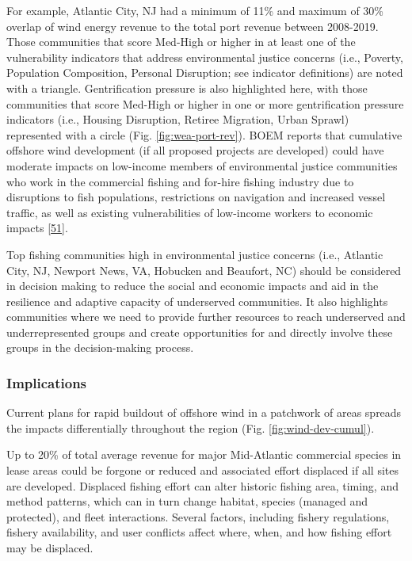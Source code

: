 \documentclass[
  10pt,
]{article}
\begin{document}
For example, Atlantic City, NJ had a minimum of 11\% and maximum of 30\%
overlap of wind energy revenue to the total port revenue between
2008-2019. Those communities that score Med-High or higher in at least
one of the vulnerability indicators that address environmental justice
concerns (i.e., Poverty, Population Composition, Personal Disruption;
see indicator definitions) are noted with a triangle. Gentrification
pressure is also highlighted here, with those communities that score
Med-High or higher in one or more gentrification pressure indicators
(i.e., Housing Disruption, Retiree Migration, Urban Sprawl) represented
with a circle (Fig. \ref{fig:wea-port-rev}). BOEM reports that
cumulative offshore wind development (if all proposed projects are
developed) could have moderate impacts on low-income members of
environmental justice communities who work in the commercial fishing and
for-hire fishing industry due to disruptions to fish populations,
restrictions on navigation and increased vessel traffic, as well as
existing vulnerabilities of low-income workers to economic impacts
{[}\protect\hyperlink{ref-boem_vineyard_2020}{51}{]}.

Top fishing communities high in environmental justice concerns (i.e.,
Atlantic City, NJ, Newport News, VA, Hobucken and Beaufort, NC) should
be considered in decision making to reduce the social and economic
impacts and aid in the resilience and adaptive capacity of underserved
communities. It also highlights communities where we need to provide
further resources to reach underserved and underrepresented groups and
create opportunities for and directly involve these groups in the
decision-making process.

\hypertarget{implications-7}{%
\subsubsection{Implications}\label{implications-7}}

Current plans for rapid buildout of offshore wind in a patchwork of
areas spreads the impacts differentially throughout the region (Fig.
\ref{fig:wind-dev-cumul}).

Up to 20\% of total average revenue for major Mid-Atlantic commercial
species in lease areas could be forgone or reduced and associated effort
displaced if all sites are developed. Displaced fishing effort can alter
historic fishing area, timing, and method patterns, which can in turn
change habitat, species (managed and protected), and fleet interactions.
Several factors, including fishery regulations, fishery availability,
and user conflicts affect where, when, and how fishing effort may be
displaced.
\end{document}
